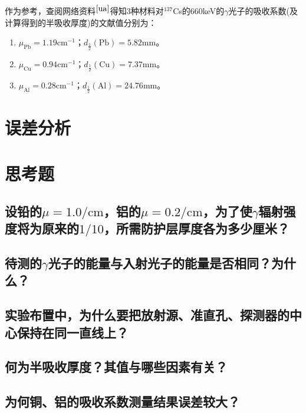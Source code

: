\documentclass[a4paper]{article}
\begin{document}
作为参考，查阅网络资料$^{\cite{ua}}$得知3种材料对$^{137}$Cs的660keV的$\gamma$光子的吸收系数(及计算得到的半吸收厚度)的文献值分别为：
\begin{enumerate}
\item $\mu_{\text{Pb}} = 1.19\text{cm}^{-1}$；$d_{\frac12}(\text{Pb}) = 5.82\text{mm}$。
\item $\mu_{\text{Cu}} = 0.94\text{cm}^{-1}$；$d_{\frac12}(\text{Cu}) = 7.37\text{mm}$。
\item $\mu_{\text{Al}} = 0.28\text{cm}^{-1}$；$d_{\frac12}(\text{Al}) = 24.76\text{mm}$。
\end{enumerate}

\section{误差分析}

\section{思考题}
\subsection{设铅的$\mu = 1.0\text{/cm}$，铝的$\mu = 0.2\text{/cm}$，为了使$\gamma$辐射强度将为原来的$1/10$，所需防护层厚度各为多少厘米？}
\subsection{待测的$\gamma$光子的能量与入射光子的能量是否相同？为什么？}
\subsection{实验布置中，为什么要把放射源、准直孔、探测器的中心保持在同一直线上？}
\subsection{何为半吸收厚度？其值与哪些因素有关？}
\subsection{为何铜、铝的吸收系数测量结果误差较大？}

\nocite{jiaocai}

\end{document}
